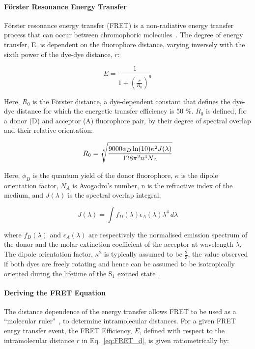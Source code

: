 \paragraph{F\"{o}rster Resonance Energy Transfer}
F\"{o}rster resonance energy transfer (FRET) is a non-radiative energy transfer process that can occur between chromophoric molecules~\cite{forster48}. The degree of energy transfer, E, is dependent on the fluorophore distance, varying inversely with the sixth power of the dye-dye distance, $r$: 

\begin{equation}
E = \frac{1}{1+ (\frac{r}{R_0})^6}
\label{eq:FRET_d}
\end{equation}

Here, $R_0$ is the F\"{o}rster distance, a dye-dependent constant that defines the dye-dye distance for which the energetic transfer efficiency is 50 \%. $R_0$ is defined, for a donor (D) and acceptor (A) fluorophore pair, by their degree of spectral overlap and their relative orientation:

\begin{equation}
R_0 = \sqrt[\leftroot{-2}\uproot{2}6]{\frac{9000\phi_D\ln(10)\kappa^2J(\lambda)}{128\pi^2n^4N_A}}
\label{eq:R_0}
\end{equation}

Here, $\phi_D$ is the quantum yield of the donor fluorophore, $\kappa$ is the dipole orientation factor, $N_A$ is Avogadro's number, n is the refractive index of the medium, and $J(\lambda)$ is the spectral overlap integral:

\begin{equation}
J(\lambda) = \int f_D(\lambda)\epsilon_A(\lambda)\lambda^4\,d\lambda
\label{eq:J}
\end{equation}

where $f_D(\lambda)$ and $\epsilon_A(\lambda)$ are respectively the normalised emission spectrum of the donor and the molar extinction coefficient of the acceptor at wavelength $\lambda$. The dipole orientation factor, $\kappa^2$ is typically assumed to be $\frac{2}{3}$, the value observed if both dyes are freely rotating and hence can be assumed to be isotropically oriented during the lifetime of the $\text{S}_1$ excited state~\cite{Demchenko2008}.

\paragraph{Deriving the FRET Equation}
The distance dependence of the energy transfer allows FRET to be used as a ``molecular ruler"~\cite{stryer67}, to determine intramolecular distances. For a given FRET enrgy transfer event, the FRET Efficiency, $E$, defined with respect to the intramolecular distance $r$ in Eq.~\ref{eq:FRET_d}, is given ratiometrically by:

